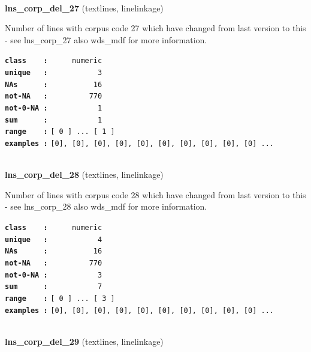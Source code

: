 \documentclass[]{article}
\begin{document}
~

\textbf{lns\_corp\_del\_27} (textlines, linelinkage)

Number of lines with corpus code 27 which have changed from last version
to this - see lns\_corp\_27 also wds\_mdf for more information.

\textbf{\texttt{class\ \ \ \ :}} \texttt{~~~~~numeric}\\
\textbf{\texttt{unique\ \ \ :}} \texttt{~~~~~~~~~~~3}\\
\textbf{\texttt{NAs\ \ \ \ \ \ :}} \texttt{~~~~~~~~~~16}\\
\textbf{\texttt{not-NA\ \ \ :}} \texttt{~~~~~~~~~770}\\
\textbf{\texttt{not-0-NA\ :}} \texttt{~~~~~~~~~~~1}\\
\textbf{\texttt{sum\ \ \ \ \ \ :}} \texttt{~~~~~~~~~~~1}\\
\textbf{\texttt{range\ \ \ \ :}}
\texttt{{[}\ 0\ {]}\ ...\ {[}\ 1\ {]}}\\
\textbf{\texttt{examples\ :}}
\texttt{{[}0{]},\ {[}0{]},\ {[}0{]},\ {[}0{]},\ {[}0{]},\ {[}0{]},\ {[}0{]},\ {[}0{]},\ {[}0{]},\ {[}0{]}\ ...}\\

~

\textbf{lns\_corp\_del\_28} (textlines, linelinkage)

Number of lines with corpus code 28 which have changed from last version
to this - see lns\_corp\_28 also wds\_mdf for more information.

\textbf{\texttt{class\ \ \ \ :}} \texttt{~~~~~numeric}\\
\textbf{\texttt{unique\ \ \ :}} \texttt{~~~~~~~~~~~4}\\
\textbf{\texttt{NAs\ \ \ \ \ \ :}} \texttt{~~~~~~~~~~16}\\
\textbf{\texttt{not-NA\ \ \ :}} \texttt{~~~~~~~~~770}\\
\textbf{\texttt{not-0-NA\ :}} \texttt{~~~~~~~~~~~3}\\
\textbf{\texttt{sum\ \ \ \ \ \ :}} \texttt{~~~~~~~~~~~7}\\
\textbf{\texttt{range\ \ \ \ :}}
\texttt{{[}\ 0\ {]}\ ...\ {[}\ 3\ {]}}\\
\textbf{\texttt{examples\ :}}
\texttt{{[}0{]},\ {[}0{]},\ {[}0{]},\ {[}0{]},\ {[}0{]},\ {[}0{]},\ {[}0{]},\ {[}0{]},\ {[}0{]},\ {[}0{]}\ ...}\\

~

\textbf{lns\_corp\_del\_29} (textlines, linelinkage)
\end{document}
